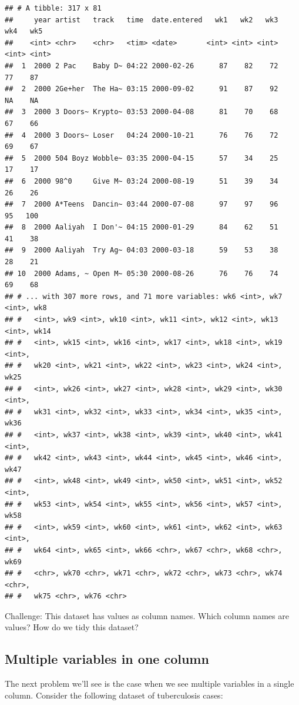 \documentclass[12pt,]{book}
\theoremstyle{definition}
\theoremstyle{definition}
\theoremstyle{definition}
\theoremstyle{remark}
\begin{document}
\begin{verbatim}
## # A tibble: 317 x 81
##     year artist   track   time  date.entered   wk1   wk2   wk3   wk4   wk5
##    <int> <chr>    <chr>   <tim> <date>       <int> <int> <int> <int> <int>
##  1  2000 2 Pac    Baby D~ 04:22 2000-02-26      87    82    72    77    87
##  2  2000 2Ge+her  The Ha~ 03:15 2000-09-02      91    87    92    NA    NA
##  3  2000 3 Doors~ Krypto~ 03:53 2000-04-08      81    70    68    67    66
##  4  2000 3 Doors~ Loser   04:24 2000-10-21      76    76    72    69    67
##  5  2000 504 Boyz Wobble~ 03:35 2000-04-15      57    34    25    17    17
##  6  2000 98^0     Give M~ 03:24 2000-08-19      51    39    34    26    26
##  7  2000 A*Teens  Dancin~ 03:44 2000-07-08      97    97    96    95   100
##  8  2000 Aaliyah  I Don'~ 04:15 2000-01-29      84    62    51    41    38
##  9  2000 Aaliyah  Try Ag~ 04:03 2000-03-18      59    53    38    28    21
## 10  2000 Adams, ~ Open M~ 05:30 2000-08-26      76    76    74    69    68
## # ... with 307 more rows, and 71 more variables: wk6 <int>, wk7 <int>, wk8
## #   <int>, wk9 <int>, wk10 <int>, wk11 <int>, wk12 <int>, wk13 <int>, wk14
## #   <int>, wk15 <int>, wk16 <int>, wk17 <int>, wk18 <int>, wk19 <int>,
## #   wk20 <int>, wk21 <int>, wk22 <int>, wk23 <int>, wk24 <int>, wk25
## #   <int>, wk26 <int>, wk27 <int>, wk28 <int>, wk29 <int>, wk30 <int>,
## #   wk31 <int>, wk32 <int>, wk33 <int>, wk34 <int>, wk35 <int>, wk36
## #   <int>, wk37 <int>, wk38 <int>, wk39 <int>, wk40 <int>, wk41 <int>,
## #   wk42 <int>, wk43 <int>, wk44 <int>, wk45 <int>, wk46 <int>, wk47
## #   <int>, wk48 <int>, wk49 <int>, wk50 <int>, wk51 <int>, wk52 <int>,
## #   wk53 <int>, wk54 <int>, wk55 <int>, wk56 <int>, wk57 <int>, wk58
## #   <int>, wk59 <int>, wk60 <int>, wk61 <int>, wk62 <int>, wk63 <int>,
## #   wk64 <int>, wk65 <int>, wk66 <chr>, wk67 <chr>, wk68 <chr>, wk69
## #   <chr>, wk70 <chr>, wk71 <chr>, wk72 <chr>, wk73 <chr>, wk74 <chr>,
## #   wk75 <chr>, wk76 <chr>
\end{verbatim}

Challenge: This dataset has values as column names. Which column names
are values? How do we tidy this dataset?

\subsection{Multiple variables in one
column}\label{multiple-variables-in-one-column}

The next problem we'll see is the case when we see multiple variables in
a single column. Consider the following dataset of tuberculosis cases:
\end{document}
